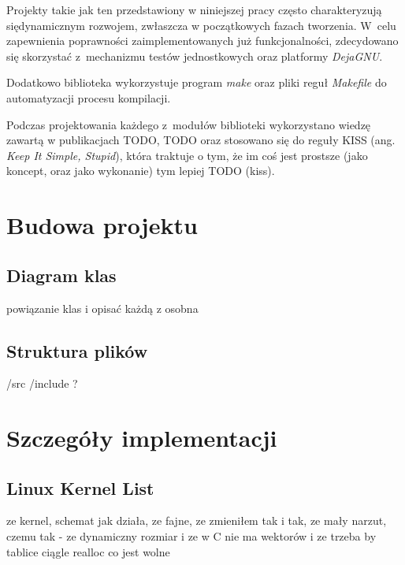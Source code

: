 \documentclass[a4paper,12pt]{thesis}
\begin{document}
Projekty takie jak ten przedstawiony w niniejszej pracy często charakteryzują siędynamicznym rozwojem, zwłaszcza w początkowych fazach tworzenia. 
W~celu zapewnienia poprawności zaimplementowanych już funkcjonalności, zdecydowano się skorzystać z~mechanizmu testów jednostkowych oraz platformy \emph{DejaGNU}.

Dodatkowo biblioteka wykorzystuje program \emph{make} oraz pliki reguł \emph{Makefile} do automatyzacji procesu kompilacji.

Podczas projektowania każdego z~modułów biblioteki wykorzystano wiedzę zawartą w publikacjach TODO, TODO oraz stosowano się do reguły KISS (ang. \emph{Keep It Simple, Stupid}), która traktuje o tym, że im coś jest prostsze (jako koncept, oraz jako wykonanie) tym lepiej TODO (kiss).
\section{Budowa projektu}
\subsection{Diagram klas}
powiązanie klas i opisać każdą z osobna
\subsection{Struktura plików}
/src /include ?
\section{Szczegóły implementacji}
\subsection{Linux Kernel List}
ze kernel, schemat jak działa, ze fajne, ze zmieniłem tak i tak, ze mały narzut, czemu tak - ze dynamiczny rozmiar i ze w C nie ma wektorów i ze trzeba by tablice ciągle realloc co jest wolne
\end{document}
